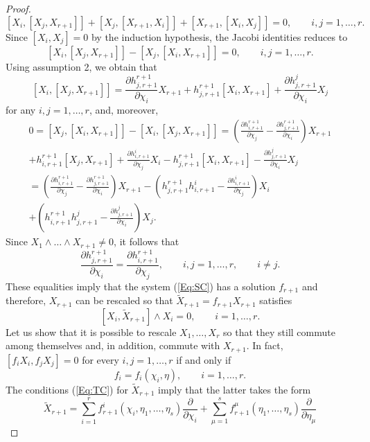 \documentclass[10pt,a4paper]{amsart}
\begin{document}
\begin{proof}
	$$
	[X_i,[X_j,X_{r+1}]]+[X_j,[X_{r+1},X_{i}]]+[X_{r+1},[X_i,X_j]]=0,\qquad i,j=1,\ldots,r.
	$$
	Since $[X_i,X_j]=0$ by the induction hypothesis, the Jacobi identities reduces to
	$$
	[X_i,[X_j,X_{r+1}]]-[X_j,[X_{i},X_{r+1}]]=0,\qquad i,j=1,\ldots,r.
	$$
	Using assumption 2, we obtain that 
	$$
	[X_i,[X_j,X_{r+1}]]=\frac{\partial h_{j,r+1}^{r+1}}{\partial \chi_i}X_{r+1}+h_{j,r+1}^{r+1}[X_i,X_{r+1}]+\frac{\partial h^{j}_{j,r+1}}{\partial \chi_i}X_j
	$$
	for any $i,j=1,\ldots,r$, and, moreover,
	\begin{multline*}
		0=[X_j,[X_i,X_{r+1}]]-[X_i,[X_j,X_{r+1}]]=\left(\frac{\partial h_{i,r+1}^{r+1}}{\partial \chi_j}-\frac{\partial h_{j,r+1}^{r+1}}{\partial \chi_i}\right)X_{r+1}\\+h_{i,r+1}^{r+1}[X_j,X_{r+1}]+\frac{\partial h^i_{i,r+1}}{\partial \chi_j}X_i-h_{j,r+1}^{r+1}[X_i,X_{r+1}]-\frac{\partial h^j_{j,r+1}}{\partial \chi_i}X_j\\=
		\left(\frac{\partial h_{i,r+1}^{r+1}}{\partial \chi_j}-\frac{\partial h_{j,r+1}^{r+1}}{\partial \chi_i}\right)X_{r+1}-\left(h_{j,r+1}^{r+1}h_{i,r+1}^{i}-\frac{\partial h^i_{i,r+1}}{\partial \chi_j}\right)X_i\\+\left(h^{r+1}_{i,r+1}h_{j,r+1}^j-\frac{\partial h^j_{j,r+1}}{\partial \chi_i}\right)X_j.
	\end{multline*}
	Since $X_1\wedge\ldots\wedge X_{r+1}\neq 0$, it follows that
	\begin{equation}\label{eq:ConS}
		\frac{\partial h_{j,r+1}^{r+1}}{\partial \chi_i}=\frac{\partial h_{i,r+1}^{r+1}}{\partial \chi_j},\qquad i,j=1,\ldots,r,\qquad i\neq j.
	\end{equation}
	These equalities imply that the system (\ref{Eq:SC}) has a solution  $f_{r+1}$ and therefore, $X_{r+1}$ can be rescaled so that $\widetilde{X}_{r+1}=f_{r+1}X_{r+1}$ satisfies
	\begin{equation}\label{Eq:TC}
		[X_i,\widetilde{X}_{r+1}]\wedge X_{i}=0,\qquad i=1,\ldots,r.
	\end{equation}
	Let us show that it is possible to rescale $X_1,\ldots, X_r$ so that they still commute among themselves and, in addition,  commute with $X_{r+1}$. In fact,  $[f_iX_i,f_jX_j]=0$ for every $i,j=1,\ldots,r$ if and only if 
	$$
	f_i=f_i(\chi_i,\eta),\qquad i=1,\ldots,r.
	$$
	The conditions (\ref{Eq:TC}) for $\widetilde{X}_{r+1}$ imply that the latter takes the form
	$$
	\widetilde{X}_{r+1}=\sum_{i=1}^rf^i_{r+1}(\chi_i,\eta_1,\ldots,\eta_s)\frac{\partial}{\partial \chi_i}+\sum_{\mu=1}^sf^\mu_{r+1}(\eta_1,\ldots,\eta_s)\frac{\partial}{\partial \eta_\mu}
$$
\end{proof}
\end{document}
